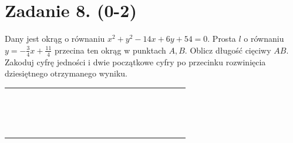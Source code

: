 \documentclass[10pt]{article}
\begin{document}
\section*{Zadanie 8. (0-2)}
Dany jest okrąg o równaniu \(x^{2}+y^{2}-14 x+6 y+54=0\). Prosta \(l\) o równaniu \(y=-\frac{3}{4} x+\frac{11}{4}\) przecina ten okrąg w punktach \(A, B\). Oblicz długość cięciwy \(A B\). Zakoduj cyfrę jedności i dwie początkowe cyfry po przecinku rozwinięcia dziesiętnego otrzymanego wyniku.

\begin{center}
\begin{tabular}{|c|c|c|c|c|c|c|c|c|c|c|c|c|c|c|c|c|c|c|c|c|c|}
\hline
 &  &  &  &  &  &  &  &  &  &  &  &  &  &  &  &  &  &  &  &  &  \\
\hline
 &  &  &  &  &  &  &  &  &  &  &  &  &  &  &  &  &  &  &  &  &  \\
\hline
 &  &  &  &  &  &  &  &  &  &  &  &  &  &  &  &  &  &  &  &  &  \\
\hline
 &  &  &  &  &  &  &  &  &  &  &  &  &  &  &  &  &  &  &  &  &  \\
\hline
 &  &  &  &  &  &  &  &  &  &  &  &  &  &  &  &  &  &  &  &  &  \\
\hline
 &  &  &  &  &  &  &  &  &  &  &  &  &  &  &  &  &  &  &  &  &  \\
\hline
 &  &  &  &  &  &  &  &  &  &  &  &  &  &  &  &  &  &  &  &  &  \\
\hline
 &  &  &  &  &  &  &  &  &  &  &  &  &  &  &  &  &  &  &  &  &  \\
\hline
 &  &  &  &  &  &  &  &  &  &  &  &  &  &  &  &  &  &  &  &  &  \\
\hline
 &  &  &  &  &  &  &  &  &  &  &  &  &  &  &  &  &  &  &  &  &  \\
\hline
 &  &  &  &  &  &  &  &  &  &  &  &  &  &  &  &  &  &  &  &  &  \\
\hline
 &  &  &  &  &  &  &  &  &  &  &  &  &  &  &  &  &  &  &  &  &  \\
\hline
 &  &  &  &  &  &  &  &  &  &  &  &  &  &  &  &  &  &  &  &  &  \\
\hline
 &  &  &  &  &  &  &  &  &  &  &  &  &  &  &  &  &  &  &  &  &  \\
\hline
 &  &  &  &  &  &  &  &  &  &  &  &  &  &  &  &  &  &  &  &  &  \\
\hline
 &  &  &  &  &  &  &  &  &  &  &  &  &  &  &  &  &  &  &  &  &  \\
\hline
 &  &  &  &  &  &  &  &  &  &  &  &  &  &  &  &  &  &  &  &  &  \\

\end{tabular}
\end{center}
\end{document}
